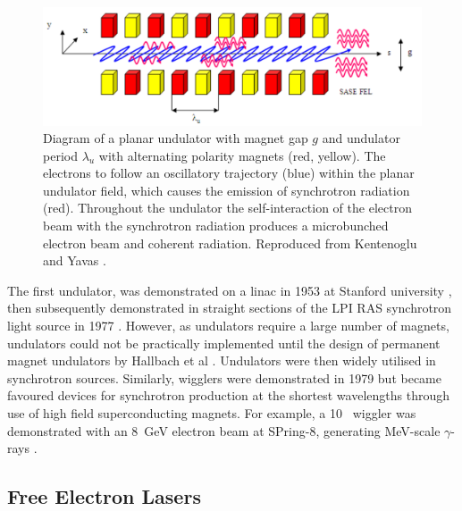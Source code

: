 \documentclass[../main.tex]{subfiles}
\begin{document}
\begin{figure}[!h]
\centering
\includegraphics[width=\textwidth]{Figures/Introduction/Planar_Undulator.pdf}
\caption{Diagram of a planar undulator with magnet gap $g$ and undulator period $\lambda_{u}$ with alternating polarity magnets (red, yellow). The electrons to follow an oscillatory trajectory (blue) within the planar undulator field, which causes the emission of synchrotron radiation (red). Throughout the undulator the self-interaction of the electron beam with the synchrotron radiation produces a microbunched electron beam and coherent radiation. Reproduced from Kentenoglu and Yavas \cite{ketenoglu2010asynchronously}.}
\label{fig:planar_undulator}
\end{figure}

The first undulator, was demonstrated on a linac in 1953 at Stanford university \cite{motz1953experiments}, then subsequently demonstrated in straight sections of the LPI RAS synchrotron light source in 1977 \cite{bessonov2010light}.  However, as undulators require a large number of magnets, undulators could not be practically implemented until the design of permanent magnet undulators by Hallbach et al \cite{halbach1983permanent}. Undulators were then widely utilised in synchrotron sources. Similarly, wigglers were demonstrated in 1979 \cite{berndt1979initial} but became favoured devices for synchrotron production at the shortest wavelengths through use of high field superconducting magnets. For example, a 10~\si{\Tesla} wiggler was demonstrated with an 8~\si{\giga\electronvolt} electron beam at SPring-8, generating \si{\mega\electronvolt}-scale $\gamma$-rays \cite{soutome2003generation}.    

\subsection{Free Electron Lasers}
\end{document}
